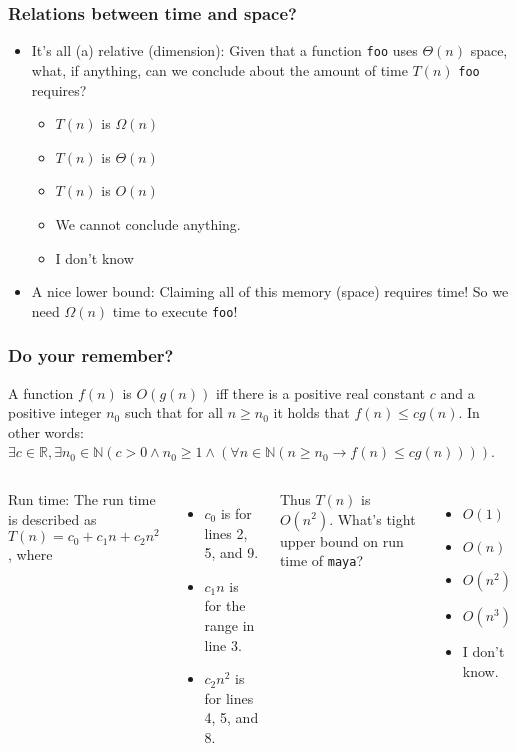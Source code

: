 \begin{frame}
	\frametitle{Relations between time and space?}

		\begin{itemize}
		\item It's all (a) relative (dimension):
		Given that a function \texttt{foo} uses $\Theta(n)$ space, what, if anything, can we conclude about the amount of
		time $T(n)$ \texttt{foo} requires?
			\begin{itemize}
				\item $T(n)$ is $\Omega(n)$
				\item $T(n)$ is $\Theta(n)$
				\item $T(n)$ is $O(n)$
				\item We cannot conclude anything.
				\item I don't know
			\end{itemize}
		\item A nice lower bound:
			Claiming all of this memory (space) requires time! So we need $\Omega(n)$ time to execute \texttt{foo}!
		\end{itemize}
\end{frame}

\begin{frame}
	\frametitle{Do your remember?}
	
	\begin{definition}[Big-Oh]
		A function $f(n)$ is $O(g(n))$ iff there is a positive real constant $c$ and a positive integer $n_0$ such that for
		all $n \geq n_0$ it holds that $f(n) \leq c g(n)$. In other words:\\
		$\exists c \in \mathbb{R}, \exists n_0 \in \mathbb{N} (c > 0 \wedge n_0 \geq 1 \wedge (\forall n \in \mathbb{N} (n
		\geq n_0 \to f(n) \leq cg(n))))$.
	\end{definition}
	
	\begin{columns}
		
			
Run time:
				The run time is described as $T(n) = c_0 + c_1n + c_2n^2$, where
				\begin{itemize}
					\item $c_0$ is for lines 2, 5, and 9.
					\item $c_1n$ is for the range in line 3.
					\item $c_2n^2$ is for lines 4, 5, and 8.
				\end{itemize}
				Thus $T(n)$ is $O(n^2)$. What's tight upper bound on run time of \texttt{maya}?
				\begin{itemize}
					\item $O(1)$
					\item $O(n)$
					\item $O(n^2)$
					\item $O(n^3)$
					\item I don't know.
				\end{itemize}
		
	\end{columns}
\end{frame}

